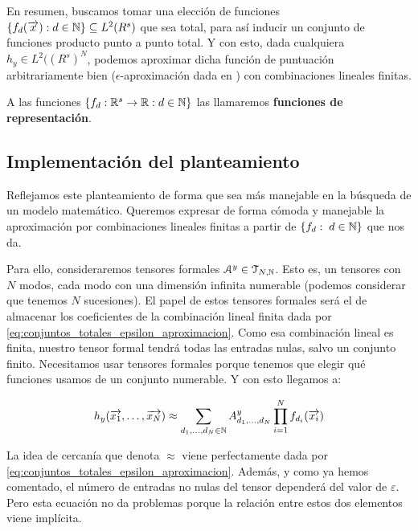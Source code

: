 En resumen, buscamos tomar una elección de funciones $\{f_d(\overrightarrow{x}): d \in \mathbb{N}\} \subseteq L^2(R^s)$ que sea total, para así inducir un conjunto de funciones producto punto a punto total. Y con esto, dada cualquiera $h_y \in L^2((R^s)^N$, podemos aproximar dicha función de puntuación arbitrariamente bien ($\epsilon$-aproximación dada en ) con combinaciones lineales finitas.

A las funciones $\{ f_d: \mathbb{R}^s \to \mathbb{R}: d \in \mathbb{N} \}$ las llamaremos \textbf{funciones de representación}.

\subsection{Implementación del planteamiento}

Reflejamos este planteamiento de forma que sea más manejable en la búsqueda de un modelo matemático. Queremos expresar de forma cómoda y manejable la aproximación por combinaciones lineales finitas a partir de $\{ f_d: \; d \in \mathbb{N} \}$ que  nos da.

Para ello, consideraremos tensores formales $\mathcal{A}^y \in \mathcal{T}_{N, \mathbb{N}}$. Esto es, un tensores con $N$ modos, cada modo con una dimensión infinita numerable (podemos considerar que tenemos $N$ sucesiones). El papel de estos tensores formales será el de almacenar los coeficientes de la combinación lineal finita dada por \eqref{eq:conjuntos_totales_epsilon_aproximacion}. Como esa combinación lineal es finita, nuestro tensor formal tendrá todas las entradas nulas, salvo un conjunto finito. Necesitamos usar tensores formales porque tenemos que elegir qué funciones usamos de un conjunto numerable. Y con esto llegamos a:

\begin{equation} \label{eq:hipotesis_en_general}
	h_y(\overrightarrow{x_1}, \ldots, \overrightarrow{x_N}) \approx \sum_{d_1, \ldots, d_N \in \mathbb{N}} A^y_{d_1, \ldots, d_N} \prod_{i = 1}^N f_{d_i}(\overrightarrow{x_i})
\end{equation}

\begin{observacion}

	La idea de cercanía que denota $\approx$ viene perfectamente dada por \eqref{eq:conjuntos_totales_epsilon_aproximacion}. Además, y como ya hemos comentado, el número de entradas no nulas del tensor dependerá del valor de $\varepsilon$. Pero esta ecuación no da problemas porque la relación entre estos dos elementos viene implícita.

\end{observacion}

